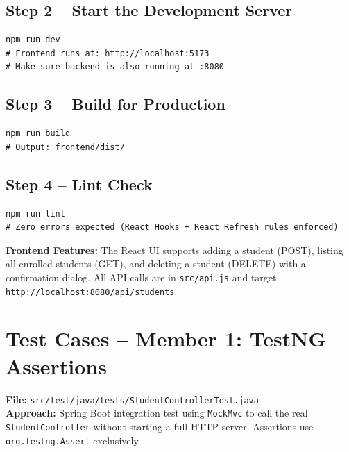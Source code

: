 \documentclass[12pt,a4paper]{article}
\begin{document}
\subsection{Step 2 -- Start the Development Server}

\begin{lstlisting}[style=shellStyle, numbers=none, caption={Start Vite dev server}]
npm run dev
# Frontend runs at: http://localhost:5173
# Make sure backend is also running at :8080
\end{lstlisting}

\subsection{Step 3 -- Build for Production}

\begin{lstlisting}[style=shellStyle, numbers=none, caption={Build frontend for production}]
npm run build
# Output: frontend/dist/
\end{lstlisting}

\subsection{Step 4 -- Lint Check}

\begin{lstlisting}[style=shellStyle, numbers=none, caption={Run ESLint}]
npm run lint
# Zero errors expected (React Hooks + React Refresh rules enforced)
\end{lstlisting}

\begin{infoblock}
\textbf{Frontend Features:} The React UI supports adding a student (POST), listing all
enrolled students (GET), and deleting a student (DELETE) with a confirmation dialog.
All API calls are in \texttt{src/api.js} and target \texttt{http://localhost:8080/api/students}.
\end{infoblock}

\section{Test Cases -- Member 1: TestNG Assertions}

\textbf{File:} \texttt{src/test/java/tests/StudentControllerTest.java}\\
\textbf{Approach:} Spring Boot integration test using \texttt{MockMvc} to call the real
\texttt{StudentController} without starting a full HTTP server. Assertions use
\texttt{org.testng.Assert} exclusively.
\end{document}
